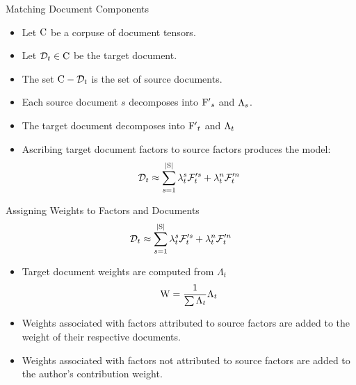 \documentclass[handout]{beamer}
\begin{document}
\begin{frame}{Matching Document Components}
  \begin{itemize}[<+->]
  \item Let $\mathrm{C}$ be a corpuse of document tensors.
  \item Let $\mathcal{D}_t \in \mathrm{C}$ be the target document.
  \item The set $\mathrm{C}-\mathcal{D}_t$ is the set of source documents.
  \item Each source document $s$ decomposes into $\mathrm{F'}_s$  and
    $\mathrm{\Lambda}_s$.
  \item The target document decomposes into $\mathrm{F'}_t$ and
    $\mathrm{\Lambda}_t$
  \item Ascribing target document factors to source factors produces
    the model:
    \[
      \mathcal{D}_t \approx \sum_{s=1}^{|\mathrm{S}|} \lambda^s_t \mathcal{F}'^s_t +
  \lambda^n_t \mathcal{F}'^n_t
    \]
  \end{itemize}
\end{frame}


\begin{frame}{Assigning Weights to Factors and Documents}
  \[
      \mathcal{D}_t \approx \sum_{s=1}^{|\mathrm{S}|} \lambda^s_t \mathcal{F}'^s_t +
  \lambda^n_t \mathcal{F}'^n_t
\]

  \begin{itemize}[<+->]
  \item Target document weights are computed from $\Lambda_t$
    \[
      \mathrm{W} = \dfrac{1}{\sum \Lambda_t} \Lambda_t
    \]
  \item Weights associated with factors attributed to source factors
    are added to the weight of their respective documents.
  \item Weights associated with factors not attributed to source
    factors are added to the author's contribution weight.
  \end{itemize}
\end{frame}
\end{document}

